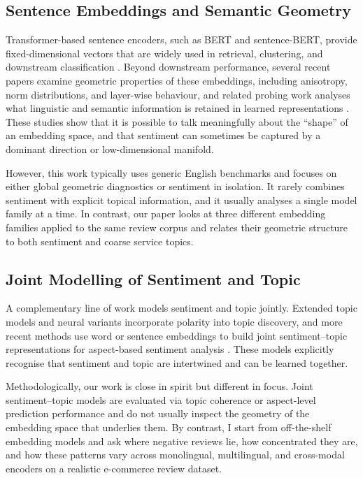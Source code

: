 \documentclass[a4paper,11pt]{article}
\begin{document}
\subsection{Sentence Embeddings and Semantic Geometry}

Transformer-based sentence encoders, such as BERT and sentence-BERT, provide fixed-dimensional vectors that are widely used in retrieval, clustering, and downstream classification \citep{devlin_2018,reimers_2019a}. 
Beyond downstream performance, several recent papers examine geometric properties of these embeddings, including anisotropy, norm distributions, and layer-wise behaviour, and related probing work analyses what linguistic and semantic information is retained in learned representations \citep{ethayarajh_2019,lindstrom_2020}. 
These studies show that it is possible to talk meaningfully about the “shape” of an embedding space, and that sentiment can sometimes be captured by a dominant direction or low-dimensional manifold.

However, this work typically uses generic English benchmarks and focuses on either global geometric diagnostics or sentiment in isolation. 
It rarely combines sentiment with explicit topical information, and it usually analyses a single model family at a time. 
In contrast, our paper looks at three different embedding families applied to the same review corpus and relates their geometric structure to both sentiment and coarse service topics.

\subsection{Joint Modelling of Sentiment and Topic}

A complementary line of work models sentiment and topic jointly. 
Extended topic models and neural variants incorporate polarity into topic discovery, and more recent methods use word or sentence embeddings to build joint sentiment--topic representations for aspect-based sentiment analysis \citep{maas_2011,huang_2020,pontiki_2014a}. 
These models explicitly recognise that sentiment and topic are intertwined and can be learned together.

Methodologically, our work is close in spirit but different in focus. 
Joint sentiment–topic models are evaluated via topic coherence or aspect-level prediction performance and do not usually inspect the geometry of the embedding space that underlies them. 
By contrast, I start from off-the-shelf embedding models and ask where negative reviews lie, how concentrated they are, and how these patterns vary across monolingual, multilingual, and cross-modal encoders on a realistic e-commerce review dataset.
\end{document}
